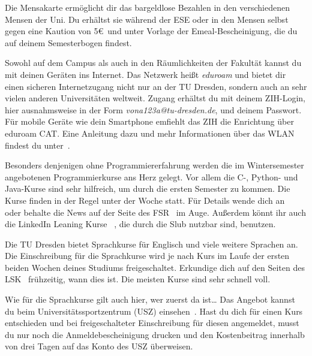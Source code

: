 \begin{itemize}[leftmargin=*]
Die Mensakarte ermöglicht dir das bargeldlose Bezahlen in den verschiedenen
Mensen der Uni. Du erhältst sie während der ESE oder in den Mensen selbst gegen
eine Kaution von 5\euro\ und unter Vorlage der Emeal-Bescheinigung, die du auf
deinem Semesterbogen findest.

\pagebreak

Sowohl auf dem Campus als auch in den Räumlichkeiten der Fakultät kannst du mit
deinen Geräten ins Internet. Das Netzwerk heißt \textit{eduroam} und bietet dir
einen sicheren Internetzugang nicht nur an der TU Dresden, sondern auch an sehr
vielen anderen Universitäten weltweit. Zugang erhältst du mit deinem ZIH-Login,
hier ausnahmsweise in der Form \textit{vona123a@tu-dresden.de}, und deinem
Passwort. Für mobile Geräte wie dein Smartphone emfiehlt das ZIH die Enrichtung über eduroam CAT. 
Eine Anleitung dazu und mehr Informationen über das WLAN findest du unter~.

Besonders denjenigen ohne Programmiererfahrung werden die im Wintersemester
angebotenen Programmierkurse ans Herz gelegt. Vor allem die C-, Python- und Java-Kurse
sind sehr hilfreich, um durch die ersten Semester zu kommen. Die Kurse finden in
der Regel unter der Woche statt. Für Details
wende dich an~ oder behalte die News auf der
Seite des FSR~ im Auge. Außerdem könnt ihr auch die LinkedIn Leaning Kurse ~, die durch die Slub nutzbar sind, benutzen.

\label{sec:sprache}
Die TU Dresden bietet Sprachkurse für Englisch und viele weitere Sprachen an.
Die Einschreibung für die Sprachkurse wird je nach Kurs im Laufe der ersten
beiden Wochen deines Studiums freigeschaltet. Erkundige dich auf den Seiten des
LSK~ frühzeitig, wann dies ist. Die
meisten Kurse sind sehr schnell voll.

\label{sec:sport}
Wie für die Sprachkurse gilt auch hier, wer zuerst da ist\ldots{} Das Angebot
kannst du beim Universitätssportzentrum (USZ) einsehen~. Hast du dich für einen Kurs entschieden und
bei freigeschalteter Einschreibung für diesen angemeldet, musst du nur noch die
Anmeldebescheinigung drucken und den Kostenbeitrag innerhalb von drei Tagen auf
das Konto des USZ überweisen.


\end{itemize}
